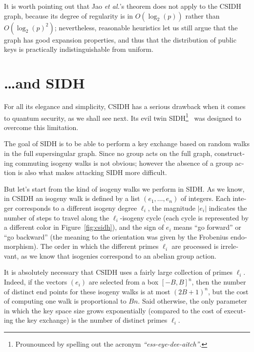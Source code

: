 \begin{otherlanguage}{english}
  It is worth pointing out that Jao \emph{et al.}'s theorem does not
  apply to the CSIDH graph, because its degree of regularity is in
  $O(\log_2(p))$ rather than $O(\log_2(p)^2)$; nevertheless,
  reasonable heuristics let us still argue that the graph has good
  expansion properties, and thus that the distribution of public keys
  is practically indistinguishable from uniform.
  
\section{\dots and SIDH}
For all its elegance and simplicity, CSIDH has a serious drawback when
it comes to quantum security, as we shall see next. Its evil twin
SIDH\footnote{Prounounced by spelling out the acronym
  \emph{``ess-eye-dee-aitch''}.}~\cite{jao+defeo2011,defeo+jao+plut12}
was designed to overcome this limitation.

The goal of SIDH is to be able to perform a key exchange based on
random walks in the full supersingular graph. Since no group acts on
the full graph, constructing commuting isogeny walks is not obvious;
however the absence of a group action is also what makes attacking
SIDH more difficult.

But let's start from the kind of isogeny walks we perform in SIDH. As
we know, in CSIDH an isogeny walk is defined by a list
$(e_1,\dots,e_n)$ of integers. Each integer corresponds to a different
isogeny degree $\ell_i$, the magnitude $|e_i|$ indicates the number of
steps to travel along the $\ell_i$-isogeny cycle (each cycle is
represented by a different color in Figure~\ref{fig:csidh}), and the
sign of $e_i$ means ``go forward'' or ``go backward'' (the meaning to
the orientation was given by the Frobenius endomorphism).  The order
in which the different primes $\ell_i$ are processed is irrelevant, as
we know that isogenies correspond to an abelian group action.

It is absolutely necessary that CSIDH uses a fairly large collection
of primes $\ell_i$. Indeed, if the vectors $(e_i)$ are selected from a
box $[-B,B]^n$, then the number of distinct end points for these
isogeny walks is at most $(2B+1)^n$, but the cost of computing one
walk is proportional to $Bn$. Said otherwise, the only parameter in
which the key space size grows exponentially (compared to the cost of
executing the key exchange) is the number of distinct primes $\ell_i$.


\end{otherlanguage}
